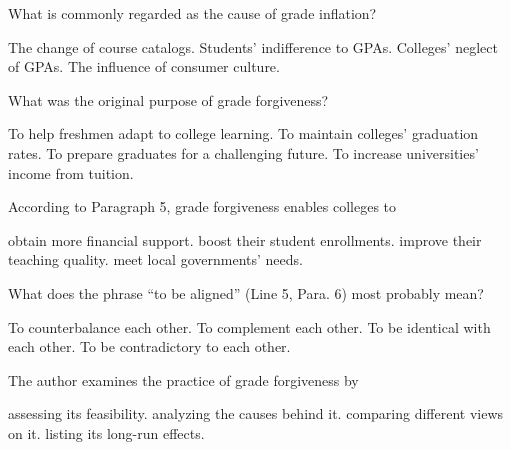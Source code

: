 \item What is commonly regarded as the cause of grade inflation?
\begin{tasks}
	\task The change of course catalogs.
	\task Students' indifference to GPAs.
	\task Colleges' neglect of GPAs.
	\task The influence of consumer culture.
\end{tasks}
\item What was the original purpose of grade forgiveness?
\begin{tasks}
	\task To help freshmen adapt to college learning.
	\task To maintain colleges' graduation rates.
	\task To prepare graduates for a challenging future.
	\task To increase universities' income from tuition.
\end{tasks}
\item According to Paragraph 5, grade forgiveness enables colleges to
\begin{tasks}
	\task obtain more financial support.
	\task boost their student enrollments.
	\task improve their teaching quality.
	\task meet local governments' needs.
\end{tasks}
\item What does the phrase ``to be aligned'' (Line 5, Para. 6) most probably mean?
\begin{tasks}
	\task To counterbalance each other.
	\task To complement each other.
	\task To be identical with each other.
	\task To be contradictory to each other.
\end{tasks}
\item The author examines the practice of grade forgiveness by
\begin{tasks}
	\task assessing its feasibility.
	\task analyzing the causes behind it.
	\task comparing different views on it.
	\task listing its long-run effects.
\end{tasks}